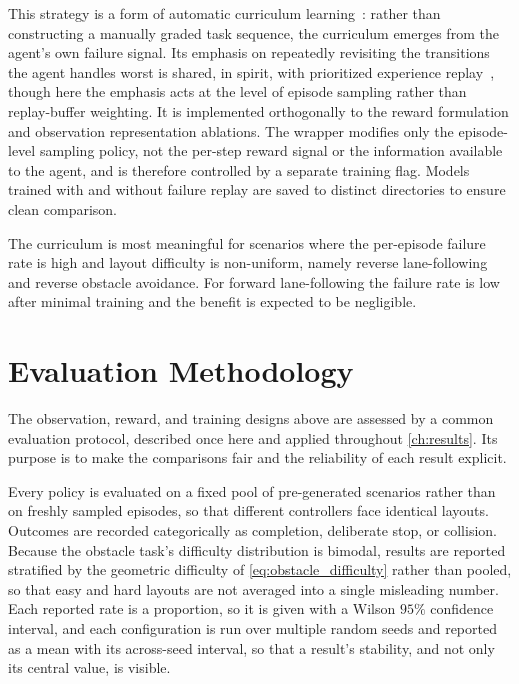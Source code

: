 This strategy is a form of automatic curriculum learning~\cite{bengio2009curriculum}: rather than constructing a manually graded task sequence, the curriculum emerges from the agent's own failure signal. Its emphasis on repeatedly revisiting the transitions the agent handles worst is shared, in spirit, with prioritized experience replay~\cite{schaul2016per}, though here the emphasis acts at the level of episode sampling rather than replay-buffer weighting. It is implemented orthogonally to the reward formulation and observation representation ablations. The wrapper modifies only the episode-level sampling policy, not the per-step reward signal or the information available to the agent, and is therefore controlled by a separate training flag. Models trained with and without failure replay are saved to distinct directories to ensure clean comparison.

The curriculum is most meaningful for scenarios where the per-episode failure rate is high and layout difficulty is non-uniform, namely reverse lane-following and reverse obstacle avoidance. For forward lane-following the failure rate is low after minimal training and the benefit is expected to be negligible.

\section{Evaluation Methodology}
\label{sec:eval_methodology}

The observation, reward, and training designs above are assessed by a common evaluation protocol, described once here and applied throughout \cref{ch:results}. Its purpose is to make the comparisons fair and the reliability of each result explicit.

Every policy is evaluated on a fixed pool of pre-generated scenarios rather than on freshly sampled episodes, so that different controllers face identical layouts. Outcomes are recorded categorically as completion, deliberate stop, or collision. Because the obstacle task's difficulty distribution is bimodal, results are reported stratified by the geometric difficulty of \cref{eq:obstacle_difficulty} rather than pooled, so that easy and hard layouts are not averaged into a single misleading number. Each reported rate is a proportion, so it is given with a Wilson $95\%$ confidence interval, and each configuration is run over multiple random seeds and reported as a mean with its across-seed interval, so that a result's stability, and not only its central value, is visible.

